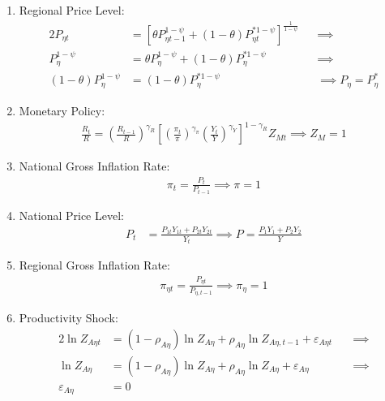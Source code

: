 \documentclass[../thesis.tex]{subfiles}
\begin{document}
\begin{enumerate}
	\item Regional Price Level:
	\begin{alignat}{2}
		P_{\eta t} &= \left[ \theta P_{\eta t-1}^{1-\psi} + (1-\theta) P_{\eta t}^{\ast 1-\psi} \right]^\frac{1}{1-\psi} &&\implies \nonumber \\
		P_{\eta}^{1-\psi} &= \theta P_{\eta}^{1-\psi} + (1-\theta) P_{\eta}^{\ast 1-\psi} &&\implies \nonumber \\ 
		(1-\theta) P_{\eta}^{1-\psi} &= (1-\theta) P_{\eta}^{\ast 1-\psi} &&\implies P_{\eta} = P_{\eta}^{\ast} \label{eq:reg-ss-general-price-level}
	\end{alignat}
	
	\item Monetary Policy:
	\begin{align}
		\label{eq:reg-ss-monetary-policy}
		\frac{R_{t}}{R} =
		\left( \frac{R_{t-1}}{R} \right)^{\gamma_R}  \left[
		\left( \frac{\pi_t}{\pi} \right)^{\gamma_\pi}
		\left( \frac{Y_{t}}{Y} \right)^{\gamma_Y} \right]^{1-\gamma_R} Z_{Mt}
		\implies Z_{M} = 1
	\end{align}
	
	\item National Gross Inflation Rate:
	\begin{align}
		\pi_t = \frac{P_t}{P_{t-1}} \implies \pi = 1 \label{eq:reg-ss-gross-inflation-rate}
	\end{align}
	
	\item National Price Level:
	\begin{align}
		P_t &= \frac{P_{1t} Y_{1t} + P_{2t} Y_{2t}}{Y_{t}} \implies P = \frac{P_{1} Y_{1} + P_{2} Y_{2}}{Y_{}} \label{eq:ss-national-price-level} %
	\end{align}
	
	\item Regional Gross Inflation Rate:
	\begin{align}
		\pi_{\eta t} = \frac{P_{\eta t}}{P_{\eta, t-1}} \implies \pi_{\eta} = 1 \label{eq:ss-regional-inflation}
	\end{align}
	
	\item Productivity Shock:
	\begin{alignat}{2}
		\ln{Z_{A\eta t}} &= (1 -\rho_{A\eta}) \ln{Z_{A\eta}} + \rho_{A\eta} \ln{Z_{A\eta,t-1}} + \varepsilon_{A\eta t} \quad &\implies \nonumber \\
		\ln{Z_{A\eta}} &= (1 -\rho_{A\eta}) \ln{Z_{A\eta}} + \rho_{A\eta} \ln{Z_{A\eta}} + \varepsilon_{A\eta} &\implies \nonumber \\
		\varepsilon_{A\eta} &= 0 \label{eq:reg-ss-productivity-shock}
	\end{alignat}
	

\end{enumerate}
\end{document}
